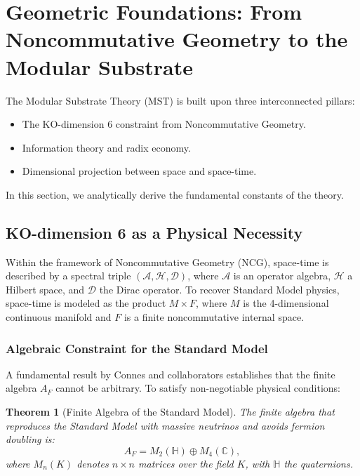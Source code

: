 \documentclass[11pt, a4paper]{article}
\theoremstyle{plain}
\newtheorem{theorem}{Theorem}[section]
\theoremstyle{definition}
\begin{document}
\section{Geometric Foundations: From Noncommutative Geometry to the Modular Substrate}
\label{sec:foundations}

The Modular Substrate Theory (MST) is built upon three interconnected pillars:

\begin{itemize}
    \item The KO-dimension 6 constraint from Noncommutative Geometry.
    \item Information theory and radix economy.
    \item Dimensional projection between space and space-time.
\end{itemize}

In this section, we analytically derive the fundamental constants of the theory.

\subsection{KO-dimension 6 as a Physical Necessity}

Within the framework of Noncommutative Geometry (NCG), space-time is described by a spectral triple $(\mathcal{A}, \mathcal{H}, \mathcal{D})$, where $\mathcal{A}$ is an operator algebra, $\mathcal{H}$ a Hilbert space, and $\mathcal{D}$ the Dirac operator. To recover Standard Model physics, space-time is modeled as the product $M \times F$, where $M$ is the 4-dimensional continuous manifold and $F$ is a finite noncommutative internal space.

\subsubsection{Algebraic Constraint for the Standard Model}

A fundamental result by Connes and collaborators \cite{Connes2012, Chamseddine2012} establishes that the finite algebra $A_F$ cannot be arbitrary. To satisfy non-negotiable physical conditions:

\begin{theorem}[Finite Algebra of the Standard Model]
The finite algebra that reproduces the Standard Model with massive neutrinos and avoids fermion doubling is:
\begin{equation}
A_F = M_2(\mathbb{H}) \oplus M_4(\mathbb{C}),
\end{equation}
where $M_n(K)$ denotes $n\times n$ matrices over the field $K$, with $\mathbb{H}$ the quaternions.
\end{theorem}
\end{document}
